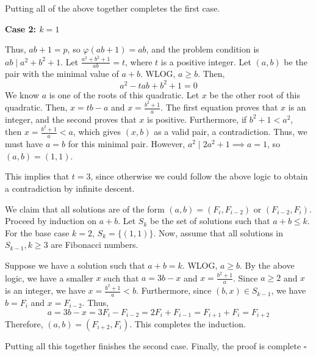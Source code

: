\begin{enumerate}
 Putting all of the above together completes the first case.

 


 \textbf{Case 2: $k = 1$}

 Thus, $ab+1=p$, so $\varphi(ab+1)=ab$, and the problem condition is $ab \mid a^2+b^2+1$. Let $\frac{a^2+b^2+1}{ab}=t$, where $t$ is a positive integer. Let $(a,b)$ be the pair with the minimal value of $a+b$. WLOG, $a\geq b$. Then, 
 \[a^2-tab+b^2+1=0\] We know $a$ is one of the roots of this quadratic. Let $x$ be the other root of this quadratic. Then, $x = tb-a$ and $x = \frac{b^2+1}{a}$. The first equation proves that $x$ is an integer, and the second proves that $x$ is positive. Furthermore, if $b^2+1 <a^2$, then $x = \frac{b^2+1}{a} < a$, which gives $(x, b)$ as a valid pair, a contradiction. Thus, we must have $a=b$ for this minimal pair. However, $a^2 \mid 2a^2+1 \implies a=1$, so $(a, b) = (1, 1)$.

 This implies that $t=3$, since otherwise we could follow the above logic to obtain a contradiction by infinite descent.

 
We claim that all solutions are of the form $(a, b) = (F_i, F_{i-2})$ or $(F_{i-2}, F_i)$. Proceed by induction on $a+b$. Let $S_k$ be the set of solutions such that $a+b\leq k$. For the base case $k=2$, $S_k = \{(1, 1)\}$. Now, assume that all solutions in $S_{k-1}, k\geq 3$ are Fibonacci numbers. 

 Suppose we have a solution such that $a+b = k$. WLOG, $a\geq b$. By the above logic, we have a smaller $x$ such that $a = 3b - x$ and $x = \frac{b^2+1}{a}$. Since $a\geq 2$ and $x$ is an integer, we have $x = \frac{b^2+1}{a} < b$. Furthermore, since $(b, x)\in S_{k-1}$, we have $b = F_i$ and $x = F_{i-2}$. Thus, 
 \[a = 3b-x = 3F_i - F_{i-2} = 2F_i + F_{i-1} = F_{i+1}+F_i = F_{i+2}\] Therefore, $(a, b) = (F_{i+2}, F_{i})$. This completes the induction. 

 
Putting all this together finishes the second case. Finally, the proof is complete $\square$



\end{enumerate}